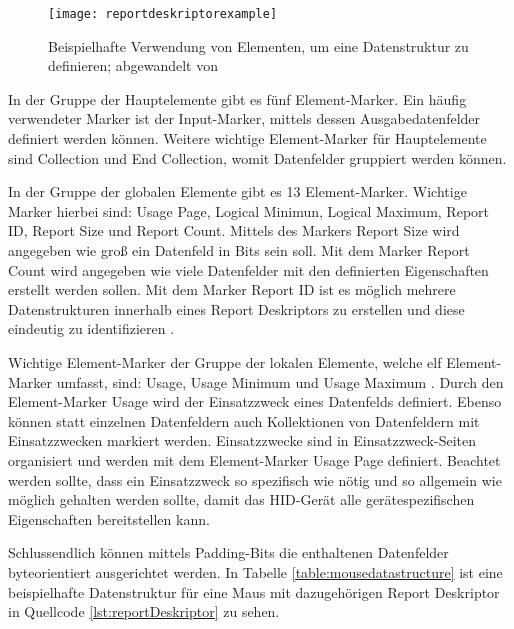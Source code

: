 \begin{figure}[h]
    \centering
    \texttt{[image: reportdeskriptorexample]}
    \caption{Beispielhafte Verwendung von Elementen, um eine Datenstruktur zu definieren; abgewandelt von \cite[S.~24]{usbHIDS}}
    \label{fig:reportdeskriptorexample}
\end{figure}

In der Gruppe der Hauptelemente gibt es fünf Element-Marker. Ein häufig verwendeter Marker ist der Input-Marker, mittels dessen Ausgabedatenfelder definiert werden können. Weitere wichtige Element-Marker für Hauptelemente sind Collection und End Collection, womit Datenfelder gruppiert werden können. \cite[S.~23f., S.~30ff.]{usbHIDS}

In der Gruppe der globalen Elemente gibt es 13 Element-Marker. Wichtige Marker hierbei sind: Usage Page, Logical Minimun, Logical Maximum, Report ID, Report Size und Report Count. Mittels des Markers Report Size wird angegeben wie groß ein Datenfeld in Bits sein soll. Mit dem Marker Report Count wird angegeben wie viele Datenfelder mit den definierten Eigenschaften erstellt werden sollen. Mit dem Marker Report ID ist es möglich mehrere Datenstrukturen innerhalb eines Report Deskriptors zu erstellen und diese eindeutig zu identifizieren \cite[S.~17]{usbHIDS}. \cite[S.~35ff.]{usbHIDS}

Wichtige Element-Marker der Gruppe der lokalen Elemente, welche elf Element-Marker umfasst, sind: Usage, Usage Minimum und Usage Maximum \cite[S.~40]{usbHIDS}. Durch den Element-Marker Usage wird der Einsatzzweck eines Datenfelds definiert. Ebenso können statt einzelnen Datenfeldern auch Kollektionen von Datenfeldern mit Einsatzzwecken markiert werden. Einsatzzwecke sind in Einsatzzweck-Seiten organisiert und werden mit dem Element-Marker Usage Page definiert. Beachtet werden sollte, dass ein Einsatzzweck so spezifisch wie nötig und so allgemein wie möglich gehalten werden sollte, damit das \acs{HID}-Gerät alle gerätespezifischen Eigenschaften bereitstellen kann. \cite[S.~15f.]{usbHIDt}

Schlussendlich können mittels Padding-Bits die enthaltenen Datenfelder byteorientiert ausgerichtet werden. In Tabelle \ref{table:mousedatastructure} ist eine beispielhafte Datenstruktur für eine Maus mit dazugehörigen Report Deskriptor in Quellcode \ref{lst:reportDeskriptor} zu sehen.

